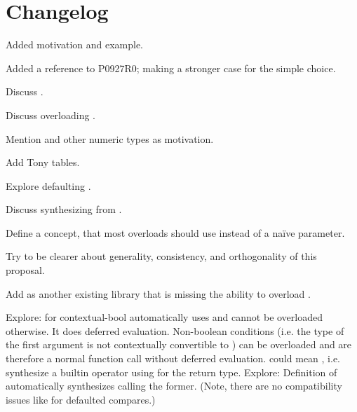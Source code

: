 \section{Changelog}
\begin{revision}
  \item Added  motivation and example.
  \item Added a reference to P0927R0; making a stronger case for the simple choice.
\end{revision}

\begin{revision}
  \item Discuss .
  \item Discuss overloading .
  \item Mention  and other numeric types as motivation.
\end{revision}

\begin{revision}
  \item Add Tony tables.
  \item Explore defaulting .
  \item Discuss synthesizing  from .
  \item Define a  concept, that most overloads should use instead of a naïve \bool parameter.
  \item Try to be clearer about generality, consistency, and orthogonality of this proposal.
  \item Add  as another existing library that is missing the ability to overload .
\end{revision}

\begin{revision}
  \todo Explore:  for contextual-bool automatically uses  and cannot be overloaded otherwise.
        It does deferred evaluation.
        Non-boolean conditions (i.e. the type of the first argument is not contextually convertible to \bool) can be overloaded and are therefore a normal function call without deferred evaluation.
  \todo {} could mean , i.e. synthesize a builtin operator using  for the return type.
  \todo Explore: Definition of  automatically synthesizes  calling the former.
        (Note, there are no compatibility issues like for defaulted compares.)
\end{revision}

